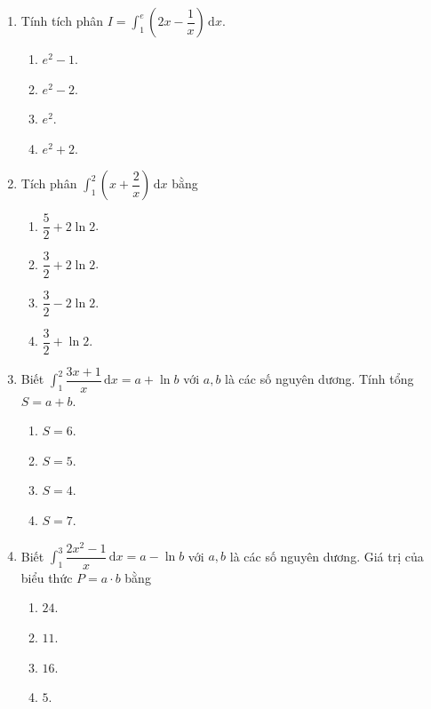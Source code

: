 \documentclass[12pt]{article}
\begin{document}
\begin{enumerate}[label=\textbf{Câu \arabic*.}]
		\item Tính tích phân $I = \displaystyle \int_1^e \left( 2x - \dfrac{1}{x} \right)\,\mathrm{d}x$.
		\begin{multicols}{4}
			\begin{enumerate}[label=\textbf{\Alph*.}]
				\item $e^2 - 1$.
				\item $e^2 - 2$.
				\item $e^2$.
				\item $e^2 + 2$.
			\end{enumerate}
		\end{multicols}
		
		\item Tích phân $\displaystyle \int_1^2 \left( x + \dfrac{2}{x} \right)\,\mathrm{d}x$ bằng
		\begin{multicols}{2}
			\begin{enumerate}[label=\textbf{\Alph*.}]
				\item $\dfrac{5}{2} + 2\ln 2$.
				\item $\dfrac{3}{2} + 2\ln 2$.
				\item $\dfrac{3}{2} - 2\ln 2$.
				\item $\dfrac{3}{2} + \ln 2$.
			\end{enumerate}
		\end{multicols}
		
		\item Biết $\displaystyle \int_1^2 \dfrac{3x + 1}{x}\,\mathrm{d}x = a + \ln b$ với $a, b$ là các số nguyên dương. Tính tổng $S = a + b$.
		\begin{multicols}{4}
			\begin{enumerate}[label=\textbf{\Alph*.}]
				\item $S = 6$.
				\item $S = 5$.
				\item $S = 4$.
				\item $S = 7$.
			\end{enumerate}
		\end{multicols}
		
		\item Biết $\displaystyle \int_1^3 \dfrac{2x^2 - 1}{x}\,\mathrm{d}x = a - \ln b$ với $a, b$ là các số nguyên dương. Giá trị của biểu thức $P = a \cdot b$ bằng
		\begin{multicols}{4}
			\begin{enumerate}[label=\textbf{\Alph*.}]
				\item $24$.
				\item $11$.
				\item $16$.
				\item $5$.
			\end{enumerate}
		\end{multicols}
		

\end{enumerate}
\end{document}
